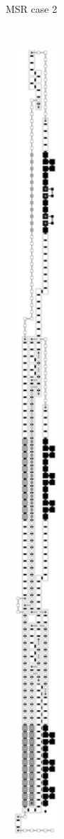 \begin{figure}[H]
\begin{subfigure}[t]{0.24\textwidth}
        \caption{\label{fig:initial_case2_msr} MSR case 2}
    \end{subfigure}%
    ~
    \begin{subfigure}[t]{0.24\textwidth}
        \centering
        \includegraphics[width=0.24\textwidth]{initial_value_case3_msr}

\end{subfigure}
\end{figure}
